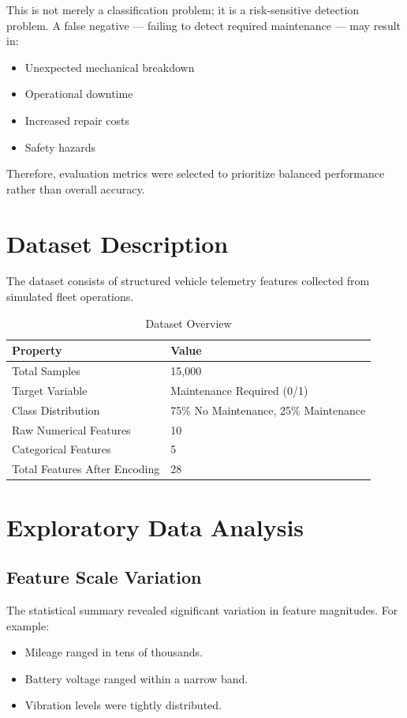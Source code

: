 \documentclass[12pt, a4paper]{article}
\begin{document}
This is not merely a classification problem; it is a risk-sensitive detection problem. A false negative — failing to detect required maintenance — may result in:

\begin{itemize}
\item Unexpected mechanical breakdown
\item Operational downtime
\item Increased repair costs
\item Safety hazards
\end{itemize}

Therefore, evaluation metrics were selected to prioritize balanced performance rather than overall accuracy.
\section{Dataset Description}

The dataset consists of structured vehicle telemetry features collected from simulated fleet operations.

\begin{table}[H]
\centering
\caption{Dataset Overview}
\begin{tabular}{ll}
\toprule
Property & Value \\
\midrule
Total Samples & 15,000 \\
Target Variable & Maintenance Required (0/1) \\
Class Distribution & 75\% No Maintenance, 25\% Maintenance \\
Raw Numerical Features & 10 \\
Categorical Features & 5 \\
Total Features After Encoding & 28 \\
\bottomrule
\end{tabular}
\end{table}

\section{Exploratory Data Analysis}

\subsection{Feature Scale Variation}

The statistical summary revealed significant variation in feature magnitudes. For example:

\begin{itemize}
\item Mileage ranged in tens of thousands.
\item Battery voltage ranged within a narrow band.
\item Vibration levels were tightly distributed.
\end{itemize}
\end{document}
